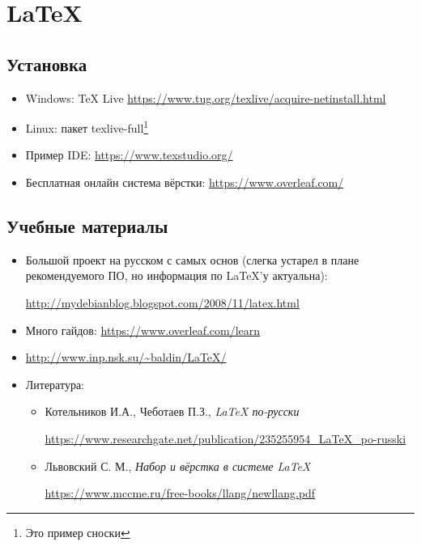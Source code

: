 \chapter{\LaTeX}\label{ch:latex}

\section{Установка}


\begin{itemize}
	\setlength{\itemsep}{1pt}%
	\setlength{\parskip}{1pt}%
	\item Windows: TeX Live \href{https://www.tug.org/texlive/acquire-netinstall.html}{https://www.tug.org/texlive/acquire-netinstall.html}
	\item Linux: пакет texlive-full\footnote{Это пример сноски}
	\item Пример IDE: \href{https://www.texstudio.org/}{https://www.texstudio.org/}
	\item Бесплатная онлайн система вёрстки: \href{https://www.overleaf.com/}{https://www.overleaf.com/}
\end{itemize}

\section{Учебные материалы}

\begin{itemize}
	\item Большой проект на русском с самых основ (слегка устарел в плане рекомендуемого ПО, но информация по \LaTeX'у актуальна):
	
	 \href{http://mydebianblog.blogspot.com/2008/11/latex.html}{http://mydebianblog.blogspot.com/2008/11/latex.html}
	 \item Много гайдов: \href{https://www.overleaf.com/learn}{https://www.overleaf.com/learn}
	\item \href{http://www.inp.nsk.su/~baldin/LaTeX/}{http://www.inp.nsk.su/\textasciitilde baldin/LaTeX/}
	\item Литература:
	\begin{itemize}
		\item Котельников И.А., Чеботаев П.З., \textit{LaTeX по-русски }
		
		\href{https://www.researchgate.net/publication/235255954_LaTeX_po-russki}{\small https://www.researchgate.net/publication/235255954\_LaTeX\_po-russki}
		
		\item Львовский С. М., \textit{Набор и вёрстка в системе \LaTeX}
		
		 \href{https://www.mccme.ru/free-books/llang/newllang.pdf}{\small https://www.mccme.ru/free-books/llang/newllang.pdf}
	\end{itemize}
\end{itemize}

